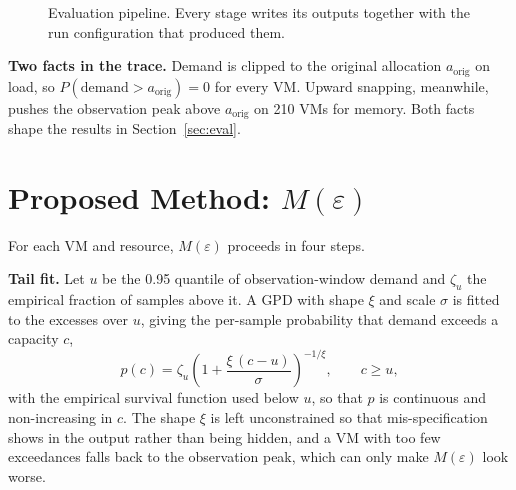 \documentclass[conference]{IEEEtran}
\newcommand{\Meps}{$M(\varepsilon)$}
\begin{document}
\begin{figure}[t]
\centering
{}
\caption{Evaluation pipeline. Every stage writes its outputs together with the run configuration that produced them.}
\label{fig:pipeline}
\end{figure}

\textbf{Two facts in the trace.} Demand is clipped to the original allocation $a_{\mathrm{orig}}$ on load, so $P(\text{demand} > a_{\mathrm{orig}}) = 0$ for every VM. Upward snapping, meanwhile, pushes the observation peak above $a_{\mathrm{orig}}$ on 210 VMs for memory. Both facts shape the results in Section~\ref{sec:eval}.

\section{Proposed Method: \Meps}
For each VM and resource, \Meps{} proceeds in four steps.

\textbf{Tail fit.} Let $u$ be the 0.95 quantile of observation-window demand and $\zeta_u$ the empirical fraction of samples above it. A GPD with shape $\xi$ and scale $\sigma$ is fitted to the excesses over $u$, giving the per-sample probability that demand exceeds a capacity $c$,
\begin{equation}
p(c) = \zeta_u \left(1 + \frac{\xi\,(c-u)}{\sigma}\right)^{-1/\xi}, \qquad c \ge u, \label{eq:tail}
\end{equation}
with the empirical survival function used below $u$, so that $p$ is continuous and non-increasing in $c$. The shape $\xi$ is left unconstrained so that mis-specification shows in the output rather than being hidden, and a VM with too few exceedances falls back to the observation peak, which can only make \Meps{} look worse.
\end{document}
